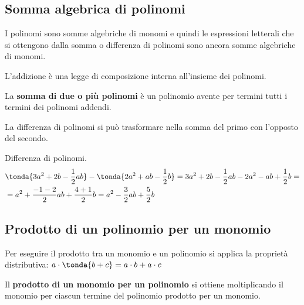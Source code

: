 \subsection{Somma algebrica di polinomi}
\label{subsec:poli_somma}

I polinomi sono somme algebriche di monomi e quindi le espressioni 
letterali che si ottengono dalla somma
o differenza di polinomi sono ancora somme algebriche di monomi.

L'addizione è una legge di composizione interna all'insieme dei polinomi.

\begin{definizione}{}{}
La \textbf{somma di due o più polinomi} è un polinomio avente per termini tutti i termini dei polinomi 
addendi.
\end{definizione}

La differenza di polinomi si può trasformare nella somma del primo 
con l'opposto del secondo.

\begin{esempio}{}{}
Differenza di polinomi.
\begin{equation*}
\begin{split}
&\tonda{3a^2+2b - \frac{1}{2}ab} - \tonda{2a^2+ab - \frac{1}{2}b} =
3a^2+2b - \frac{1}{2}ab - 2a^2 - ab + \frac{1}{2}b = \\
&=a^2 + \frac{-1-2}{2}ab + \frac{4+1}{2}b = 
a^2 - \frac{3}{2}ab + \frac{5}{2}b
\end{split}
\end{equation*}
\end{esempio}


\subsection{Prodotto di un polinomio per un monomio}
\label{subsec:poli_prodottopermonomio}

Per eseguire il prodotto tra un monomio e un polinomio si applica la 
proprietà distributiva: \quad 
\( a \cdot \tonda{b + c} = a \cdot b + a \cdot c\)

\begin{definizione}{}{} 
Il \textbf{prodotto di un monomio per un polinomio} si ottiene moltiplicando
il monomio per ciascun termine del polinomio
{prodotto per un monomio}.
\end{definizione}


